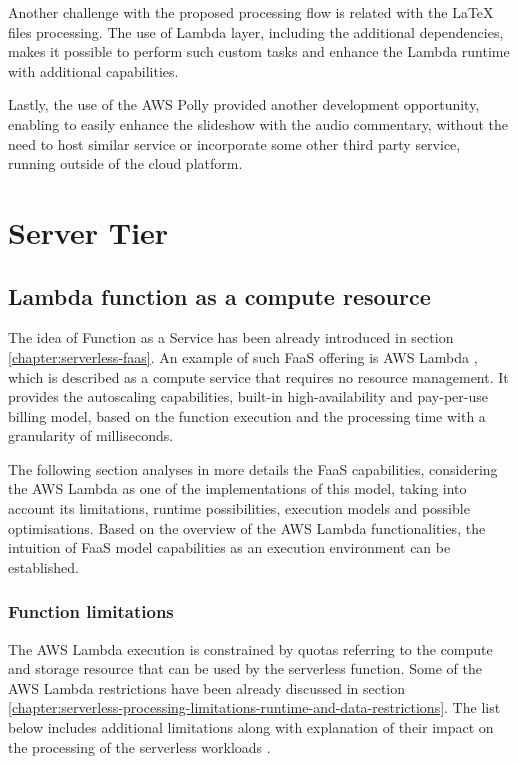 Another challenge with the proposed processing flow is related with the LaTeX files processing. The use of Lambda layer, including the additional dependencies, makes it possible to perform such custom tasks and enhance the Lambda runtime with additional capabilities.

Lastly, the use of the AWS Polly provided another development opportunity, enabling to easily enhance the slideshow with the audio commentary, without the need to host similar service or incorporate some other third party service, running outside of the cloud platform.

\section{Server Tier}

\subsection{Lambda function as a compute resource} \label{chapter:lambda-function-as-a-compute-resource}

The idea of Function as a Service has been already introduced in section \ref{chapter:serverless-faas}.
An example of such FaaS offering is AWS Lambda \cite{AWSLambda}, which is described as a compute service that requires no resource management. It provides the autoscaling capabilities, built-in high-availability and pay-per-use billing model, based on the function execution and the processing time with a granularity of milliseconds. 

The following section analyses in more details the FaaS capabilities, considering the AWS Lambda as one of the implementations of this model, taking into account its limitations, runtime possibilities, execution models and possible optimisations.
Based on the overview of the AWS Lambda functionalities, the intuition of FaaS model capabilities as an execution environment can be established.

\subsubsection{Function limitations}

The AWS Lambda execution is constrained by quotas referring to the compute and storage resource that can be used by the serverless function.
Some of the AWS Lambda restrictions have been already discussed in section \ref{chapter:serverless-processing-limitations-runtime-and-data-restrictions}.
The list below includes additional limitations along with explanation of their impact on the processing of the serverless workloads \cite{AWSLambdaQuotas}.

